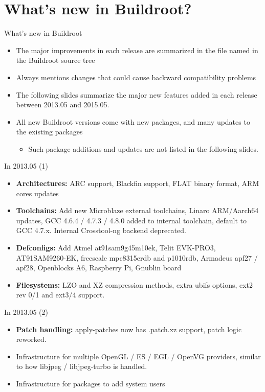 \section{What's new in Buildroot?}

\begin{frame}{What's new in Buildroot}
  \begin{itemize}
  \item The major improvements in each release are summarized in the
    file named  in the Buildroot source tree
  \item Always mentions changes that could cause backward
    compatibility problems
  \item The following slides summarize the major new features added in
    each release between 2013.05 and 2015.05.
  \item All new Buildroot versions come with new packages, and many
    updates to the existing packages
    \begin{itemize}
    \item Such package additions and updates are not listed in the
      following slides.
    \end{itemize}
  \end{itemize}
\end{frame}

\begin{frame}{In 2013.05 (1)}
  \begin{itemize}
  \item {\bf Architectures:} ARC support, Blackfin support, FLAT
    binary format, ARM cores updates
  \item {\bf Toolchains:} Add new Microblaze external toolchains,
    Linaro ARM/Aarch64 updates, GCC 4.6.4 / 4.7.3 / 4.8.0 added to
    internal toolchain, default to GCC 4.7.x. Internal Crosstool-ng
    backend deprecated.
  \item {\bf Defconfigs:} Add Atmel at91sam9g45m10ek, Telit EVK-PRO3,
    AT91SAM9260-EK, freescale mpc8315erdb and p1010rdb, Armadeus apf27
    / apf28, Openblocks A6, Raspberry Pi, Gnublin board
  \item {\bf Filesystems:} LZO and XZ compression methods, extra ubifs
    options, ext2 rev 0/1 and ext3/4 support.
  \end{itemize}
\end{frame}

\begin{frame}{In 2013.05 (2)}
  \begin{itemize}
  \item {\bf Patch handling:} apply-patches now has .patch.xz support,
    patch logic reworked.
  \item Infrastructure for multiple OpenGL / ES / EGL / OpenVG
    providers, similar to how libjpeg / libjpeg-turbo is handled.
  \item Infrastructure for packages to add system users
  \end{itemize}
\end{frame}

